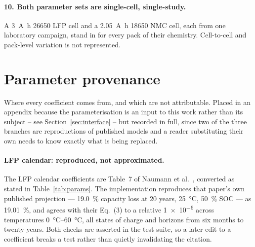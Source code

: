 \documentclass[11pt,a4paper]{article}
\begin{document}
\paragraph{10. Both parameter sets are single-cell, single-study.}
A \SI{3}{\ampere\hour} 26650 LFP cell and a \SI{2.05}{\ampere\hour}
18650 NMC cell, each from one laboratory campaign, stand in for every
pack of their chemistry. Cell-to-cell and pack-level variation is not
represented.

\appendix
\section{Parameter provenance}
\label{sec:provenance}

Where every coefficient comes from, and which are not attributable.
Placed in an appendix because the parameterisation is an input to this
work rather than its subject -- see Section~\ref{sec:interface} -- but
recorded in full, since two of the three branches are reproductions of
published models and a reader substituting their own needs to know
exactly what is being replaced.
\label{sec:provenance}

\paragraph{LFP calendar: reproduced, not approximated.}
The LFP calendar coefficients are Table~7 of Naumann et
al.~\cite{naumann2018}, converted as stated in
Table~\ref{tab:params}. The implementation reproduces that paper's own
published projection --- \SI{19.0}{\percent} capacity loss at 20 years,
\SI{25}{\celsius}, \SI{50}{\percent} SOC --- as \SI{19.01}{\percent},
and agrees with their Eq.~(3) to a relative \num{1e-6} across
temperatures \SIrange{0}{60}{\celsius}, all states of charge and
horizons from six months to twenty years. Both checks are asserted in
the test suite, so a later edit to a coefficient breaks a test rather
than quietly invalidating the citation.
\end{document}
